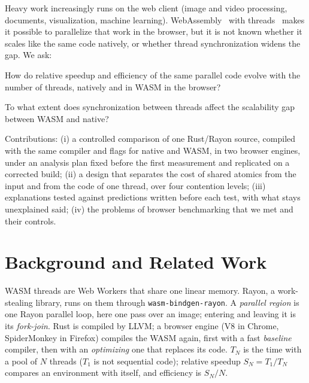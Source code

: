 \documentclass[sigplan]{acmart}
\begin{document}
Heavy work increasingly runs on the web client (image and video processing,
documents, visualization, machine learning). WebAssembly~\cite{haas2017}
with threads~\cite{watt2019} makes it possible to parallelize that work in
the browser, but it is not known whether it scales like the same code
natively, or whether thread synchronization widens the gap. We ask:

\begin{description}[nosep,leftmargin=2.5em]
  \item[RQ1] How do relative speedup and efficiency of the same parallel
  code evolve with the number of threads, natively and in WASM in the
  browser?
  \item[RQ2] To what extent does synchronization between threads affect the
  scalability gap between WASM and native?
\end{description}

\noindent Contributions: (i) a controlled comparison of one Rust/Rayon
source, compiled with the same compiler and flags for native and WASM, in
two browser engines, under an analysis plan fixed before the first
measurement and replicated on a corrected build; (ii) a design that
separates the cost of shared atomics from the input and from the code of
one thread, over four contention levels; (iii) explanations tested against
predictions written before each test, with what stays unexplained said;
(iv) the problems of browser benchmarking that we met and their controls.

\section{Background and Related Work}

WASM threads are Web Workers that share one linear memory. Rayon, a
work-stealing library, runs on them through \texttt{wasm-bindgen-rayon}. A
\emph{parallel region} is one Rayon parallel loop, here one pass over an
image; entering and leaving it is its \emph{fork-join}. Rust is compiled by
LLVM; a browser engine (V8 in Chrome, SpiderMonkey in Firefox) compiles the
WASM again, first with a fast \emph{baseline} compiler, then with an
\emph{optimizing} one that replaces its code. $T_N$ is the time with a pool
of $N$ threads ($T_1$ is not sequential code); relative speedup $S_N =
T_1/T_N$ compares an environment with itself, and efficiency is $S_N/N$.
\end{document}
